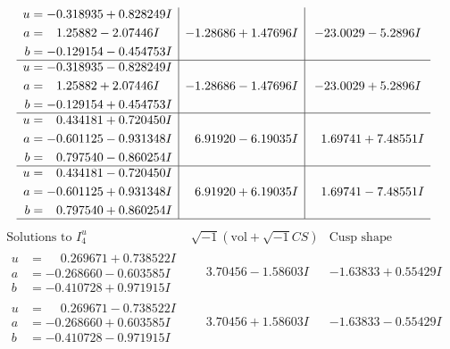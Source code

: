 \documentclass[1p]{elsarticle_modified}
\theoremstyle{definition}
\newcommand{\I}{\sqrt{-1}}
\begin{document}
$$\begin{array}{c|c|c}
\begin{aligned}
u &= -0.318935 + 0.828249 I \\
a &= \phantom{-}1.25882 - 2.07446 I \\
b &= -0.129154 - 0.454753 I\end{aligned}
 & -1.28686 + 1.47696 I & -23.0029 - 5.2896 I \\ \hline\begin{aligned}
u &= -0.318935 - 0.828249 I \\
a &= \phantom{-}1.25882 + 2.07446 I \\
b &= -0.129154 + 0.454753 I\end{aligned}
 & -1.28686 - 1.47696 I & -23.0029 + 5.2896 I \\ \hline\begin{aligned}
u &= \phantom{-}0.434181 + 0.720450 I \\
a &= -0.601125 - 0.931348 I \\
b &= \phantom{-}0.797540 - 0.860254 I\end{aligned}
 & \phantom{-}6.91920 - 6.19035 I & \phantom{-}1.69741 + 7.48551 I \\ \hline\begin{aligned}
u &= \phantom{-}0.434181 - 0.720450 I \\
a &= -0.601125 + 0.931348 I \\
b &= \phantom{-}0.797540 + 0.860254 I\end{aligned}
 & \phantom{-}6.91920 + 6.19035 I & \phantom{-}1.69741 - 7.48551 I\\
 \hline 
 \end{array}$$\newpage$$\begin{array}{c|c|c}  
\text{Solutions to }I^u_{4}& \I (\text{vol} + \sqrt{-1}CS) & \text{Cusp shape}\\
 \hline 
\begin{aligned}
u &= \phantom{-}0.269671 + 0.738522 I \\
a &= -0.268660 - 0.603585 I \\
b &= -0.410728 + 0.971915 I\end{aligned}
 & \phantom{-}3.70456 - 1.58603 I & -1.63833 + 0.55429 I \\ \hline\begin{aligned}
u &= \phantom{-}0.269671 - 0.738522 I \\
a &= -0.268660 + 0.603585 I \\
b &= -0.410728 - 0.971915 I\end{aligned}
 & \phantom{-}3.70456 + 1.58603 I & -1.63833 - 0.55429 I \\ \hline\begin{aligned}

\end{aligned}
\end{array}$$
\end{document}
